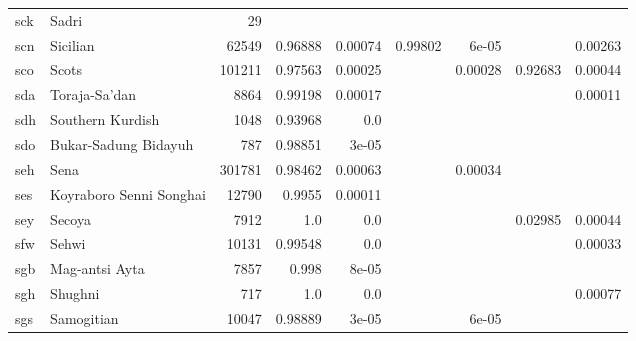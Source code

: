 \documentclass[11pt]{article}
\begin{document}
\begin{table*}[h]
{\begin{tabular}{llrrrrrrr}
sck         & Sadri         & 29         &          &          &          &          &          &          \\

scn         & Sicilian         & 62549         & 0.96888         & 0.00074         & 0.99802         & 6e-05         &          & 0.00263         \\

sco         & Scots         & 101211         & 0.97563         & 0.00025         &          & 0.00028         & 0.92683         & 0.00044         \\

sda         & Toraja-Sa'dan         & 8864         & 0.99198         & 0.00017         &          &          &          & 0.00011         \\

sdh         & Southern Kurdish         & 1048         & 0.93968         & 0.0         &          &          &          &          \\

sdo         & Bukar-Sadung Bidayuh         & 787         & 0.98851         & 3e-05         &          &          &          &          \\

seh         & Sena         & 301781         & 0.98462         & 0.00063         &          & 0.00034         &          &          \\

ses         & Koyraboro Senni Songhai         & 12790         & 0.9955         & 0.00011         &          &          &          &          \\

sey         & Secoya         & 7912         & 1.0         & 0.0         &          &          & 0.02985         & 0.00044         \\

sfw         & Sehwi         & 10131         & 0.99548         & 0.0         &          &          &          & 0.00033         \\

sgb         & Mag-antsi Ayta         & 7857         & 0.998         & 8e-05         &          &          &          &          \\

sgh         & Shughni         & 717         & 1.0         & 0.0         &          &          &          & 0.00077         \\

sgs         & Samogitian         & 10047         & 0.98889         & 3e-05         &          & 6e-05         &          &          \\


\end{tabular}}
\end{table*}
\end{document}
